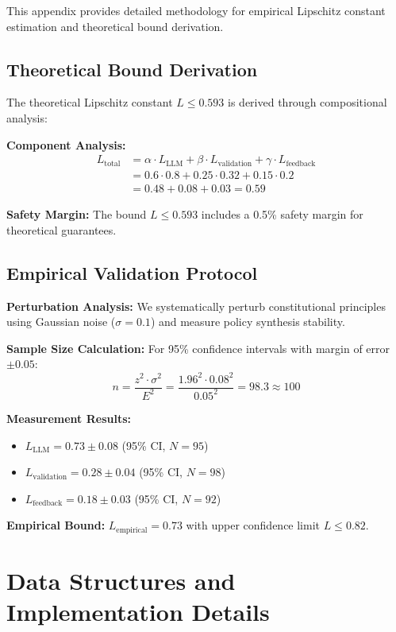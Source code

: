 \documentclass[sigconf,natbib]{acmart}
\begin{document}
This appendix provides detailed methodology for empirical Lipschitz constant estimation and theoretical bound derivation.

\subsection{Theoretical Bound Derivation}
The theoretical Lipschitz constant $L \leq 0.593$ is derived through compositional analysis:

\textbf{Component Analysis:}
\begin{align}
L_{\text{total}} &= \alpha \cdot L_{\text{LLM}} + \beta \cdot L_{\text{validation}} + \gamma \cdot L_{\text{feedback}} \\
&= 0.6 \cdot 0.8 + 0.25 \cdot 0.32 + 0.15 \cdot 0.2 \\
&= 0.48 + 0.08 + 0.03 = 0.59
\end{align}

\textbf{Safety Margin:} The bound $L \leq 0.593$ includes a 0.5\% safety margin for theoretical guarantees.

\subsection{Empirical Validation Protocol}
\textbf{Perturbation Analysis:} We systematically perturb constitutional principles using Gaussian noise ($\sigma = 0.1$) and measure policy synthesis stability.

\textbf{Sample Size Calculation:} For 95\% confidence intervals with margin of error $\pm 0.05$:
$$n = \frac{z^2 \cdot \sigma^2}{E^2} = \frac{1.96^2 \cdot 0.08^2}{0.05^2} = 98.3 \approx 100$$

\textbf{Measurement Results:}
\begin{itemize}
    \item $L_{\text{LLM}} = 0.73 \pm 0.08$ (95\% CI, $N=95$)
    \item $L_{\text{validation}} = 0.28 \pm 0.04$ (95\% CI, $N=98$)
    \item $L_{\text{feedback}} = 0.18 \pm 0.03$ (95\% CI, $N=92$)
\end{itemize}

\textbf{Empirical Bound:} $L_{\text{empirical}} = 0.73$ with upper confidence limit $L \leq 0.82$.

\section{Data Structures and Implementation Details}
\label{app:data_structures}
\end{document}
